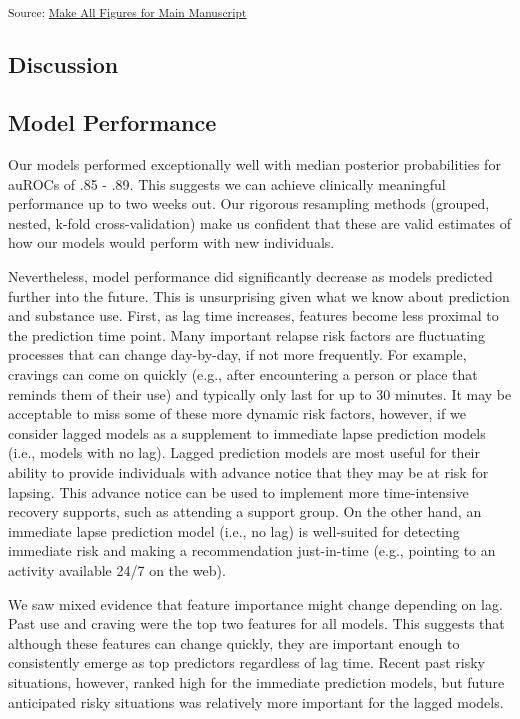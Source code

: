 \documentclass[
]{agujournal2019}
\begin{document}
\textsubscript{Source:
\href{https://jjcurtin.github.io/study_lag/notebooks/mak_figures-preview.html\#cell-fig-shap}{Make
All Figures for Main Manuscript}}

\subsection{Discussion}\label{discussion}

\subsection{Model Performance}\label{model-performance}

Our models performed exceptionally well with median posterior
probabilities for auROCs of .85 - .89. This suggests we can achieve
clinically meaningful performance up to two weeks out. Our rigorous
resampling methods (grouped, nested, k-fold cross-validation) make us
confident that these are valid estimates of how our models would perform
with new individuals.

Nevertheless, model performance did significantly decrease as models
predicted further into the future. This is unsurprising given what we
know about prediction and substance use. First, as lag time increases,
features become less proximal to the prediction time point. Many
important relapse risk factors are fluctuating processes that can change
day-by-day, if not more frequently. For example, cravings can come on
quickly (e.g., after encountering a person or place that reminds them of
their use) and typically only last for up to 30 minutes. It may be
acceptable to miss some of these more dynamic risk factors, however, if
we consider lagged models as a supplement to immediate lapse prediction
models (i.e., models with no lag). Lagged prediction models are most
useful for their ability to provide individuals with advance notice that
they may be at risk for lapsing. This advance notice can be used to
implement more time-intensive recovery supports, such as attending a
support group. On the other hand, an immediate lapse prediction model
(i.e., no lag) is well-suited for detecting immediate risk and making a
recommendation just-in-time (e.g., pointing to an activity available
24/7 on the web).

We saw mixed evidence that feature importance might change depending on
lag. Past use and craving were the top two features for all models. This
suggests that although these features can change quickly, they are
important enough to consistently emerge as top predictors regardless of
lag time. Recent past risky situations, however, ranked high for the
immediate prediction models, but future anticipated risky situations was
relatively more important for the lagged models.
\end{document}
